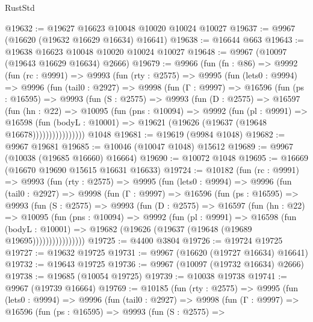 \begin{lexlean}{RustStd}
\begin{coremodule}
{\begin{coremodule}
{{{{{{{{{{{{{{{{{{{{{{{{{{{{{{{{{{{{{{{{{{{{{{{{{{{{{{{{{{{{{{{{{{{{{{{{{{{{{{@19632 := @19627 @16623 @10048 @10020 @10024 @10027
@19637 := @9967 (@16620 (@19632 @16629 @16634) @16641)
@19638 := @16644 @663
@19643 := @19638 @16623 @10048 @10020 @10024 @10027
@19648 := @9967 (@10097 (@19643 @16629 @16634) @2666)
@19679 := @9966
    (fun (fn : @86) =>
    @9992
      (fun (rc : @9991) =>
      @9993
        (fun (rty : @2575) =>
        @9995
          (fun (lets0 : @9994) =>
          @9996
            (fun (tail0 : @2927) =>
            @9998
              (fun (Γ : @9997) =>
              @16596
                (fun (ps : @16595) =>
                @9993
                  (fun (S : @2575) =>
                  @9993
                    (fun (D : @2575) =>
                    @16597
                      (fun (hn : @22) =>
                      @10095
                        (fun (pns : @10094) =>
                        @9992
                          (fun (pl : @9991) =>
                          @16598
                            (fun (bodyL : @10001) =>
                            @19621 (@19626 (@19637 (@19648 @16678))))))))))))))))
    @1048
@19681 := @19619 (@9984 @1048)
@19682 := @9967 @19681
@19685 := @10046 (@10047 @1048) @15612
@19689 := @9967 (@10038 (@19685 @16660) @16664)
@19690 := @10072 @1048
@19695 := @16669 (@16670 @19690 @15615 @16631 @16633)
@19724 := @10182
    (fun (rc : @9991) =>
    @9993
      (fun (rty : @2575) =>
      @9995
        (fun (lets0 : @9994) =>
        @9996
          (fun (tail0 : @2927) =>
          @9998
            (fun (Γ : @9997) =>
            @16596
              (fun (ps : @16595) =>
              @9993
                (fun (S : @2575) =>
                @9993
                  (fun (D : @2575) =>
                  @16597
                    (fun (hn : @22) =>
                    @10095
                      (fun (pns : @10094) =>
                      @9992
                        (fun (pl : @9991) =>
                        @16598
                          (fun (bodyL : @10001) =>
                          @19682 (@19626 (@19637 (@19648 (@19689 @19695))))))))))))))))
@19725 := @4400 @3804
@19726 := @19724 @19725
@19727 := @19632 @19725
@19731 := @9967 (@16620 (@19727 @16634) @16641)
@19732 := @19643 @19725
@19736 := @9967 (@10097 (@19732 @16634) @2666)
@19738 := @19685 (@10054 @19725)
@19739 := @10038 @19738
@19741 := @9967 (@19739 @16664)
@19769 := @10185
    (fun (rty : @2575) =>
    @9995
      (fun (lets0 : @9994) =>
      @9996
        (fun (tail0 : @2927) =>
        @9998
          (fun (Γ : @9997) =>
          @16596
            (fun (ps : @16595) =>
            @9993
              (fun (S : @2575) =>
}}}}}}}}}}}}}}}}}}}}}}}}}}}}}}}}}}}}}}}}}}}}}}}}}}}}}}}}}}}}}}}}}}}}}}}}}}}}}}
\end{coremodule}}
\end{coremodule}
\end{lexlean}

